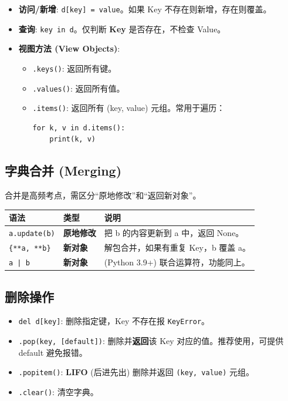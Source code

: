 \documentclass[12pt, a4paper]{article}
\begin{document}
\begin{itemize}
    \item \textbf{访问/新增}: \texttt{d[key] = value}。如果 Key 不存在则新增，存在则覆盖。
    \item \textbf{查询}: \texttt{key in d}。仅判断 \textbf{Key} 是否存在，不检查 Value。
    \item \textbf{视图方法 (View Objects)}:
    \begin{itemize}
        \item \texttt{.keys()}: 返回所有键。
        \item \texttt{.values()}: 返回所有值。
        \item \texttt{.items()}: 返回所有 (key, value) 元组。常用于遍历：
        \begin{lstlisting}
for k, v in d.items():
    print(k, v)
        \end{lstlisting}
    \end{itemize}
\end{itemize}

\subsection{字典合并 (Merging)}

合并是高频考点，需区分“原地修改”和“返回新对象”。

\begin{table}[ht]
\centering
\begin{tabular}{l l l}
\toprule
\textbf{语法} & \textbf{类型} & \textbf{说明} \\
\midrule
\texttt{a.update(b)} & \textbf{原地修改} & 把 b 的内容更新到 a 中，返回 None。 \\
\texttt{\{**a, **b\}} & \textbf{新对象} & 解包合并，如果有重复 Key，b 覆盖 a。 \\
\texttt{a | b} & \textbf{新对象} & (Python 3.9+) 联合运算符，功能同上。 \\
\bottomrule
\end{tabular}
\end{table}

\subsection{删除操作}

\begin{itemize}
    \item \texttt{del d[key]}: 删除指定键，Key 不存在报 \texttt{KeyError}。
    \item \texttt{.pop(key, [default])}: 删除并\textbf{返回}该 Key 对应的值。推荐使用，可提供 default 避免报错。
    \item \texttt{.popitem()}: \textbf{LIFO} (后进先出) 删除并返回 \texttt{(key, value)} 元组。
    \item \texttt{.clear()}: 清空字典。
\end{itemize}
\end{document}
